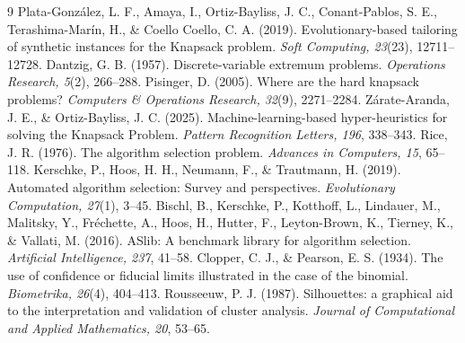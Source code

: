 \documentclass[a4paper,11pt]{article}
\theoremstyle{plain}
\theoremstyle{definition}
\theoremstyle{remark}
\begin{document}
\begin{thebibliography}{9}\small
{} Plata-Gonz\'alez, L. F., Amaya, I., Ortiz-Bayliss, J. C., Conant-Pablos, S. E.,
Terashima-Mar\'in, H., \& Coello Coello, C. A. (2019). Evolutionary-based tailoring of
synthetic instances for the Knapsack problem. \emph{Soft Computing, 23}(23), 12711--12728.
 Dantzig, G. B. (1957). Discrete-variable extremum problems.
\emph{Operations Research, 5}(2), 266--288.
 Pisinger, D. (2005). Where are the hard knapsack problems?
\emph{Computers \& Operations Research, 32}(9), 2271--2284.
 Z\'arate-Aranda, J. E., \& Ortiz-Bayliss, J. C. (2025).
Machine-learning-based hyper-heuristics for solving the Knapsack Problem. \emph{Pattern
Recognition Letters, 196}, 338--343.
 Rice, J. R. (1976). The algorithm selection problem. \emph{Advances in
Computers, 15}, 65--118.
 Kerschke, P., Hoos, H. H., Neumann, F., \& Trautmann, H. (2019).
Automated algorithm selection: Survey and perspectives. \emph{Evolutionary Computation,
27}(1), 3--45.
 Bischl, B., Kerschke, P., Kotthoff, L., Lindauer, M., Malitsky, Y.,
Fr\'echette, A., Hoos, H., Hutter, F., Leyton-Brown, K., Tierney, K., \& Vallati, M.
(2016). ASlib: A benchmark library for algorithm selection. \emph{Artificial Intelligence,
237}, 41--58.
 Clopper, C. J., \& Pearson, E. S. (1934). The use of confidence or
fiducial limits illustrated in the case of the binomial. \emph{Biometrika, 26}(4), 404--413.
 Rousseeuw, P. J. (1987). Silhouettes: a graphical aid to the
interpretation and validation of cluster analysis. \emph{Journal of Computational and
Applied Mathematics, 20}, 53--65.
\end{thebibliography}
\end{document}
